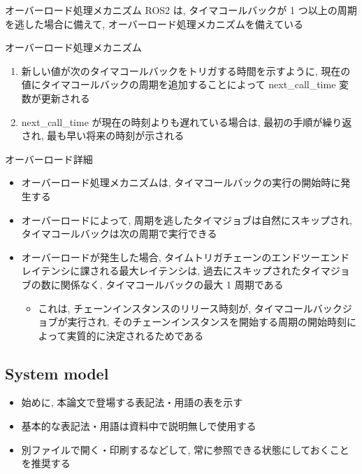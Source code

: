 \begin{frame}{オーバーロード処理メカニズム}
    ROS2 は, タイマコールバックが 1 つ以上の周期を逃した場合に備えて, オーバーロード処理メカニズムを備えている
    \begin{block}{オーバーロード処理メカニズム}
        \setlength{\linewidth}{0.98\columnwidth}
        \begin{enumerate}
            \item 新しい値が次のタイマコールバックをトリガする時間を示すように, 現在の値にタイマコールバックの周期を追加することによって next\_call\_time 変数が更新される
            \item next\_call\_time が現在の時刻よりも遅れている場合は, 最初の手順が繰り返され, 最も早い将来の時刻が示される
        \end{enumerate}
    \end{block}
\end{frame}

\begin{frame}{オーバーロード詳細}
    \begin{itemize}
        \item オーバーロード処理メカニズムは, タイマコールバックの実行の開始時に発生する
        \item オーバーロードによって, 周期を逃したタイマジョブは自然にスキップされ, タイマコールバックは次の周期で実行できる
        \item オーバーロードが発生した場合, タイムトリガチェーンのエンドツーエンドレイテンシに課される最大レイテンシは, 過去にスキップされたタイマジョブの数に関係なく, タイマコールバックの最大 1 周期である
              \begin{itemize}
                  \item これは, チェーンインスタンスのリリース時刻が, タイマコールバックジョブが実行され, そのチェーンインスタンスを開始する周期の開始時刻によって実質的に決定されるためである
              \end{itemize}
    \end{itemize}
\end{frame}


\subsection{System model}
\label{ssec: system model}

\begin{frame}{}
    \begin{itemize}
        \item 始めに, 本論文で登場する表記法・用語の表を示す
        \item 基本的な表記法・用語は資料中で説明無しで使用する
        \item 別ファイルで開く・印刷するなどして, 常に参照できる状態にしておくことを推奨する
    \end{itemize}
\end{frame}


